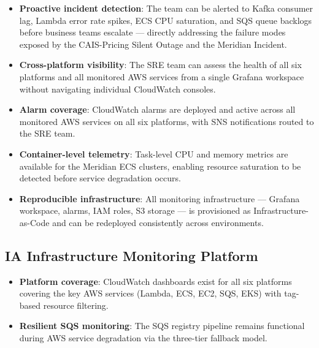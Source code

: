 \begin{itemize}
    \item \textbf{Proactive incident detection}: The team can be alerted
          to Kafka consumer lag, Lambda error rate spikes, ECS CPU
          saturation, and SQS queue backlogs before business teams
          escalate --- directly addressing the failure modes exposed by
          the CAIS-Pricing Silent Outage and the Meridian Incident.

    \item \textbf{Cross-platform visibility}: The SRE team can assess
          the health of all six platforms and all monitored AWS services
          from a single Grafana workspace without navigating individual
          CloudWatch consoles.

    \item \textbf{Alarm coverage}: CloudWatch alarms are deployed and
          active across all monitored AWS services on all six platforms,
          with SNS notifications routed to the SRE team.

    \item \textbf{Container-level telemetry}: Task-level CPU and memory
          metrics are available for the Meridian ECS clusters, enabling
          resource saturation to be detected before service degradation
          occurs.

    \item \textbf{Reproducible infrastructure}: All monitoring
          infrastructure --- Grafana workspace, alarms, IAM roles, S3
          storage --- is provisioned as Infrastructure-as-Code and
          can be redeployed consistently across environments.
\end{itemize}

\subsection{IA Infrastructure Monitoring Platform}

\begin{itemize}
    \item \textbf{Platform coverage}: CloudWatch dashboards exist for
          all six platforms covering the key AWS services (Lambda, ECS,
          EC2, SQS, EKS) with tag-based resource filtering.

    \item \textbf{Resilient SQS monitoring}: The SQS registry pipeline
          remains functional during AWS service degradation via the
          three-tier fallback model.
\end{itemize}

